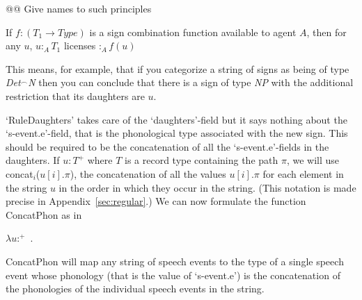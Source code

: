 @@ Give names to such principles

\begin{ex} 
If $f:(T_1\rightarrow Type)$ is a sign combination function available to agent $A$, then for
any $u$, $u :_A T_1$ licenses $:_A f(u)$ 
\end{ex} 
This means, for example, that if you categorize a string of signs as
being of type \textit{Det}$^{\frown}$\textit{N} then you can conclude
that there is a sign of type \textit{NP} with the additional
restriction that its daughters are $u$.   

`RuleDaughters' takes care of the `daughters'-field but it says
nothing about the `s-event.e'-field, that is the phonological type
associated with the new sign.  This should be required to be the
concatenation of all the `s-event.e'-fields in the daughters. If
$u:T^+$ where $T$ is a record type containing the path $\pi$, we will
use concat$_i$($u[i].\pi$),
the concatenation of all the values $u[i].\pi$ for each element in the
string $u$ in the order in which they occur in the string. (This
notation is made precise in Appendix~\ref{sec:regular}.) We can now
formulate the function ConcatPhon as in \nexteg{}
\begin{ex} 
$\lambda
u$:$^+$\
. \\
\hspace*{1em} 
\end{ex} 
ConcatPhon will map any string of speech events to the type of a
single speech event whose phonology (that is the value of `s-event.e')
is the concatenation of the phonologies of the individual speech
events in the string.

